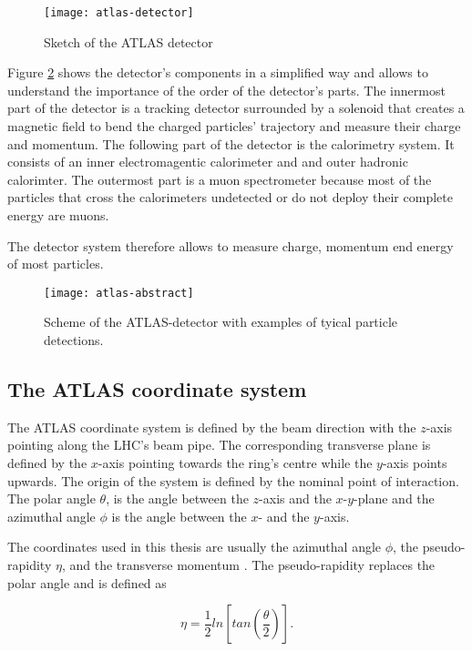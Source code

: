\begin{figure}[h]
  \centering
  \texttt{[image: atlas-detector]}
  \caption[Sketch of the ATLAS detector]{Sketch of the ATLAS detector \cite{atlasfigures}}
  \label{fig:atlas}
\end{figure}

Figure \ref{fig:atlas_sketch} shows the detector's components in a simplified way and allows to understand the importance of the order of the detector's parts. The innermost part of the detector is a tracking detector surrounded by a solenoid that creates a magnetic field to bend the charged particles' trajectory and measure their charge and momentum.
The following part of the detector is the calorimetry system. It consists of an inner electromagentic calorimeter and and outer hadronic calorimter. The outermost part is a muon spectrometer because most of the particles that cross the calorimeters undetected or do not deploy their complete energy are muons.

The detector system therefore allows to measure charge, momentum end energy of most particles.


\begin{figure}[h]
  \centering
  \texttt{[image: atlas-abstract]}
  \caption[Sketch of the transverse section of the ATLAS detector]{Scheme of the ATLAS-detector with examples of tyical particle detections. \cite{atlasfigures}}
  \label{fig:atlas_sketch}
\end{figure}

\subsection{The ATLAS coordinate system}

The ATLAS coordinate system is defined by the beam direction with the $z$-axis pointing along the LHC's beam pipe. The corresponding transverse plane is defined by the $x$-axis pointing towards the ring's centre while the $y$-axis points upwards. The origin of the system is defined by the nominal point of interaction. The polar angle $\theta$, is the angle between the $z$-axis and the $x$-$y$-plane and the azimuthal angle $\phi$ is the angle between the $x$- and the $y$-axis.

The coordinates used in this thesis are usually the azimuthal angle $\phi$, the pseudo-rapidity $\eta$, and the transverse momentum \pT. The pseudo-rapidity replaces the polar angle and is defined as

\begin{equation}
\eta = \frac{1}{2} ln\left[ tan\left(\frac{\theta}{2}\right)\right].
\end{equation}

